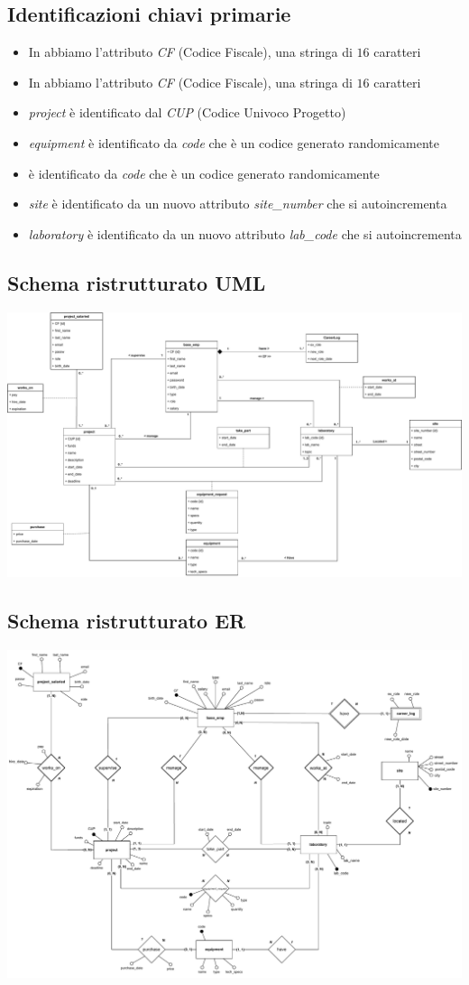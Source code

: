 \subsection{Identificazioni chiavi primarie}
\begin{itemize}
	\item In \textit{\baseemp} abbiamo l'attributo \textit{CF} (Codice Fiscale), una stringa di $16$ caratteri
	\item In \textit{\projectsalaried} abbiamo l'attributo \textit{CF} (Codice Fiscale), una stringa di $16$ caratteri
	\item \textit{project} è identificato dal \textit{CUP} (Codice Univoco Progetto)
	\item \textit{equipment} è identificato da \textit{code} che è un codice generato randomicamente
	\item \textit{\equipmentrequest} è identificato da \textit{code} che è un codice generato randomicamente
	\item \textit{site} è identificato da un nuovo attributo \textit{site\_number} che si autoincrementa
	\item \textit{laboratory} è identificato da un nuovo attributo \textit{lab\_code} che si autoincrementa
\end{itemize}
\newpage

\subsection{Schema ristrutturato UML}
\bigskip \includegraphics[width=\textwidth]{images/Ristrutturato-UML.drawio.pdf}


\subsection{Schema ristrutturato ER}
\bigskip \includegraphics[width=\textwidth]{images/Ristrutturato-ER.drawio.pdf}



